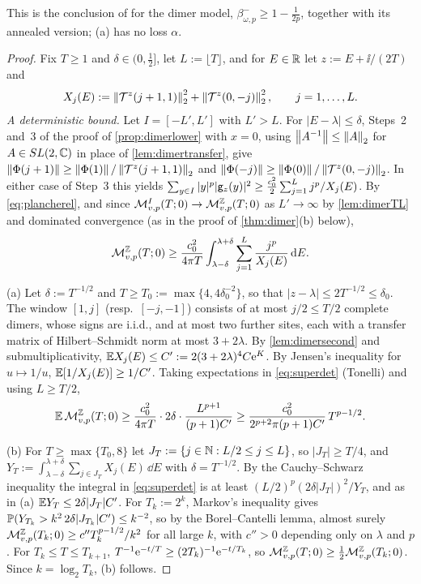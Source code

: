 This is the conclusion of \cite[Thm.~4]{JSBS2003} for the dimer model, $\beta^-_{\omega,p}\ge1-\frac1{2p}$, together with its
annealed version; (a) has no loss $\alpha$.

\begin{proof}
Fix $T\ge1$ and $\delta\in(0,\frac12]$, let $L:=\lfloor T\rfloor$, and for $E\in\mathbb{R}$ let $z:=E+\ii/(2T)$ and
\[
  X_j(E):=\left\|\mathcal{T}^z(j+1,1)\right\|_2^2+\left\|\mathcal{T}^z(0,-j)\right\|_2^2,\qquad j=1,\dots,L .
\]
\emph{A deterministic bound.}  Let $I=[-L',L']$ with $L'>L$.  For $|E-\lambda|\le\delta$, Steps~2 and~3 of the proof of
\cref{prop:dimerlower} with $x=0$, using $\left\|A^{-1}\right\|\le\left\|A\right\|_2$ for $A\in SL(2,\mathbb{C})$ in place of
\cref{lem:dimertransfer}, give $\left\|\Phi(j+1)\right\|\ge\left\|\Phi(1)\right\|/\left\|\mathcal{T}^z(j+1,1)\right\|_2$ and
$\left\|\Phi(-j)\right\|\ge\left\|\Phi(0)\right\|/\left\|\mathcal{T}^z(0,-j)\right\|_2$.  In either case of Step~3 this yields
$\sum_{y\in I}|y|^p|\mathsf{g}_z(y)|^2\ge\frac{c_0^2}2\sum_{j=1}^Lj^p/X_j(E)$.  By \eqref{eq:plancherel}, and since
$\mathcal{M}^I_{v,p}(T;0)\to\mathcal{M}^{\mathbb{Z}}_{v,p}(T;0)$ as $L'\to\infty$ by \cref{lem:dimerTL} and dominated convergence (as in the proof
of \cref{thm:dimer}(b) below),
\begin{equation}\label{eq:superdet}
  \mathcal{M}^{\mathbb{Z}}_{v,p}(T;0)\ge\frac{c_0^2}{4\pi T}\int_{\lambda-\delta}^{\lambda+\delta}\sum_{j=1}^L\frac{j^p}{X_j(E)}\,\mathrm{d} E .
\end{equation}

(a) Let $\delta:=T^{-1/2}$ and $T\ge T_0:=\max\{4,4\delta_0^{-2}\}$, so that $|z-\lambda|\le2T^{-1/2}\le\delta_0$.  The
window $[1,j]$ (resp.\ $[-j,-1]$) consists of at most $j/2\le T/2$ complete dimers, whose signs are i.i.d., and at most
two further sites, each with a transfer matrix of Hilbert--Schmidt norm at most $3+2\lambda$.  By \cref{lem:dimersecond}
and submultiplicativity, $\mathbb{E} X_j(E)\le C':=2(3+2\lambda)^4C\mathrm{e}^{K}$.  By Jensen's inequality for $u\mapsto1/u$,
$\mathbb{E}[1/X_j(E)]\ge1/C'$.  Taking expectations in \eqref{eq:superdet} (Tonelli) and using $L\ge T/2$,
\[
  \mathbb{E}\,\mathcal{M}^{\mathbb{Z}}_{v,p}(T;0)\ge\frac{c_0^2}{4\pi T}\cdot2\delta\cdot\frac{L^{p+1}}{(p+1)C'}\ge\frac{c_0^2}{2^{p+2}\pi(p+1)C'}\,T^{p-1/2}.
\]

(b) For $T\ge\max\{T_0,8\}$ let $J_T:=\{j\in\mathbb{N}:L/2\le j\le L\}$, so $|J_T|\ge T/4$, and
$Y_T:=\int_{\lambda-\delta}^{\lambda+\delta}\sum_{j\in J_T}X_j(E)\,\dd E$ with $\delta=T^{-1/2}$.  By the Cauchy--Schwarz
inequality the integral in \eqref{eq:superdet} is at least $(L/2)^p(2\delta|J_T|)^2/Y_T$, and as in (a)
$\mathbb{E} Y_T\le2\delta|J_T|C'$.  For $T_k:=2^k$, Markov's inequality gives $\mathbb{P}(Y_{T_k}>k^2\,2\delta|J_{T_k}|C')\le k^{-2}$,
so by the Borel--Cantelli lemma, almost surely $\mathcal{M}^{\mathbb{Z}}_{v,p}(T_k;0)\ge c''T_k^{p-1/2}/k^2$ for all large $k$, with
$c''>0$ depending only on $\lambda$ and $p$.  For $T_k\le T\le T_{k+1}$, $T^{-1}\mathrm{e}^{-t/T}\ge(2T_k)^{-1}\mathrm{e}^{-t/T_k}$, so
$\mathcal{M}^{\mathbb{Z}}_{v,p}(T;0)\ge\frac12\mathcal{M}^{\mathbb{Z}}_{v,p}(T_k;0)$.  Since $k=\log_2T_k$, (b) follows.
\end{proof}

